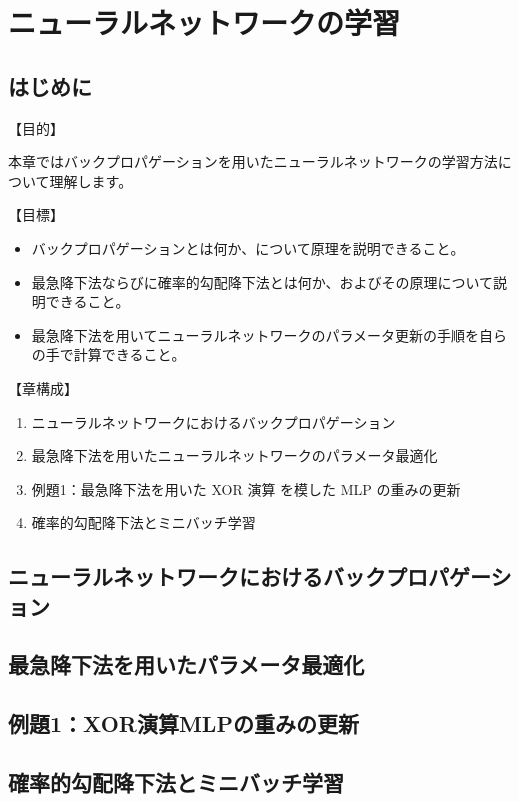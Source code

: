 \chapter{ニューラルネットワークの学習}

\section{はじめに}

【目的】

本章ではバックプロパゲーションを用いたニューラルネットワークの学習方法について理解します。

【目標】

\begin{itemize}
    \item バックプロパゲーションとは何か、について原理を説明できること。
    \item 最急降下法ならびに確率的勾配降下法とは何か、およびその原理について説明できること。
    \item 最急降下法を用いてニューラルネットワークのパラメータ更新の手順を自らの手で計算できること。
\end{itemize}

【章構成】

\begin{enumerate}
    \item ニューラルネットワークにおけるバックプロパゲーション
    \item 最急降下法を用いたニューラルネットワークのパラメータ最適化
    \item 例題1：最急降下法を用いた XOR 演算 を模した MLP の重みの更新
    \item 確率的勾配降下法とミニバッチ学習
\end{enumerate}

\section{ニューラルネットワークにおけるバックプロパゲーション}

\section{最急降下法を用いたパラメータ最適化}

\section{例題1：XOR演算MLPの重みの更新}

\section{確率的勾配降下法とミニバッチ学習}

